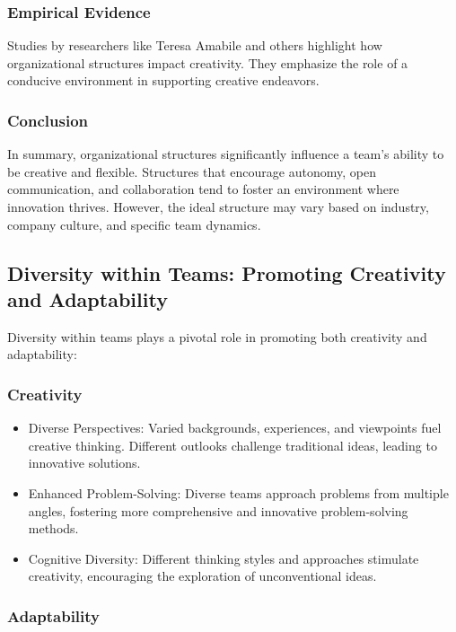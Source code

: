 \documentclass[a4paper, twoside]{article}
\begin{document}
\subsubsection{Empirical Evidence}

Studies by researchers like Teresa Amabile and others highlight how organizational structures impact creativity. They emphasize the role of a conducive environment in supporting creative endeavors.


\subsubsection{Conclusion}
In summary, organizational structures significantly influence a team's ability to be creative and flexible. Structures that encourage autonomy, open communication, and collaboration tend to foster an environment where innovation thrives. However, the ideal structure may vary based on industry, company culture, and specific team dynamics.


\subsection{Diversity within Teams: Promoting Creativity and Adaptability}

Diversity within teams plays a pivotal role in promoting both creativity and adaptability:

\subsubsection{Creativity}

\begin{itemize}
    \item{Diverse Perspectives:} Varied backgrounds, experiences, and viewpoints fuel creative thinking. Different outlooks challenge traditional ideas, leading to innovative solutions.
    
    \item{Enhanced Problem-Solving:} Diverse teams approach problems from multiple angles, fostering more comprehensive and innovative problem-solving methods.
    
    \item{Cognitive Diversity:} Different thinking styles and approaches stimulate creativity, encouraging the exploration of unconventional ideas.
\end{itemize}

\subsubsection{Adaptability}
\end{document}
